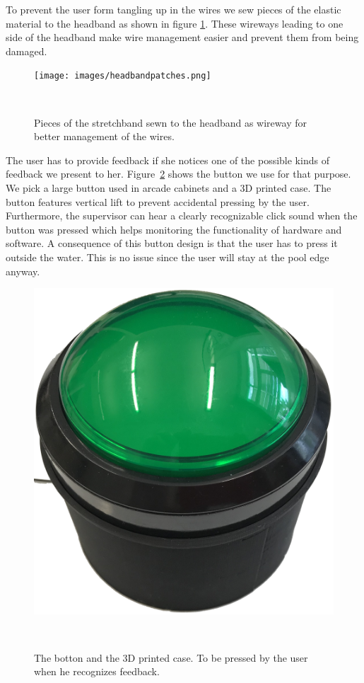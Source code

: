 To prevent the user form tangling up in the wires we sew pieces of the elastic material to the headband as shown in figure \ref{fig:headbandpatches}.
These wireways leading to one side of the headband make wire management easier and prevent them from being damaged.

\begin{figure}
	\texttt{[image: images/headbandpatches.png]}
	\caption{Pieces of the stretchband sewn to the headband as wireway for better management of the wires.}~\label{fig:headbandpatches}
\end{figure}

The user has to provide feedback if she notices one of the possible kinds of feedback we present to her.
Figure~\ref{fig:button} shows the button we use for that purpose.
We pick a large button used in arcade cabinets and a 3D printed case. 
The button features vertical lift to prevent accidental pressing by the user. 
Furthermore, the supervisor can hear a clearly recognizable click sound when the button was pressed which helps monitoring the functionality of hardware and software.
A consequence of this button design is that the user has to press it outside the water.
This is no issue since the user will stay at the pool edge anyway.

\begin{figure}
	\includegraphics[width= \textwidth]{images/button.png}
	\caption{The botton and the 3D printed case. To be pressed by the user when he recognizes feedback.}~\label{fig:button}
\end{figure}

